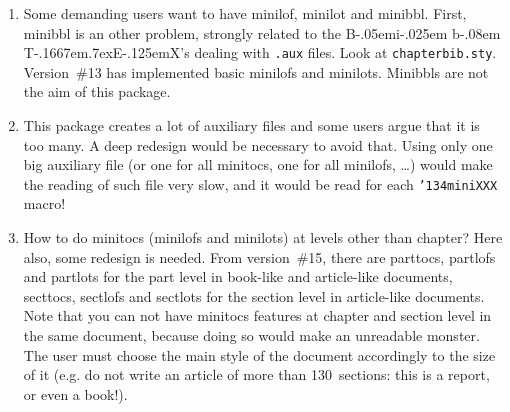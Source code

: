 \documentclass[12pt,a4paper]{book}
\newcommand{\BibTeX}{{\rm B\kern-.05em{\sc i\kern-.025em b}\kern-.08em
    T\kern-.1667em\lower.7ex\hbox{E}\kern-.125emX}}
\def\bs{{\tt\char'134}}
\begin{document}
\begin{enumerate}
would break. It is better to add {\tt\bs chapter} commands,
to create empty (but numbered in a legal way) chapters.
Since version~\#10, {\tt minitoc.sty} works with appendices.
Version \#19 allows to begin with a chapter other that number~1.
\item
Some demanding users want to have minilof, minilot and
minibbl. First, minibbl is an other problem, strongly
related to the \BibTeX's dealing with {\tt.aux} files. Look
at {\tt chapterbib.sty}.  Version~\#13 has implemented basic minilofs
and minilots. Minibbls are not the aim of this package.
\item
This package creates a lot of auxiliary files and some users
argue that it is too many. A deep redesign would be
necessary to avoid that. Using only one big auxiliary file
(or one for all minitocs, one for all minilofs, \ldots)
would make the reading of such file very slow, and it would
be read for each {\tt\bs miniXXX} macro!
\item
How to do minitocs (minilofs and minilots) at levels other
than chapter? Here also, some redesign is needed.
From version~\#15, there are parttocs, partlofs and
partlots for the part level in book-like and article-like documents,
secttocs, sectlofs and sectlots for the section level in article-like
documents. Note that you can not have minitocs features at chapter
and section level in the same document, because doing so would make
an unreadable monster. The user must choose the main style of
the document accordingly to the size of it (e.g. do not write an article
of more than 130~sections: this is a report, or even a book!).


\end{enumerate}
\end{document}

